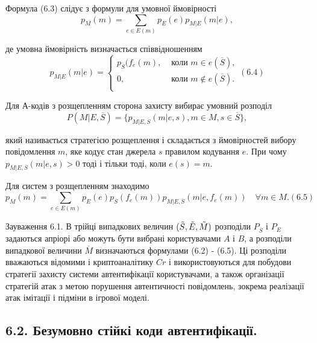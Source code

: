 Формула (6.3) слідує з формули для умовної ймовірності
\begin{equation*}
    p_M(m) = \sum\limits_{e \in E(m)} p_E(e) p_{M|E}(m|e),
\end{equation*}

де умовна ймовірність визначається співвідношенням
\begin{equation}
    p_{M|E}(m|e) = \left\{ \begin{array}{ll}
        p_{\overline{S}}(f_e(m), & \text{ коли } m \in e(\overline{S}), \\
        0, & \text{ коли } m \not\in e(\overline{S}). \\
    \end{array} \right. (6.4)
\end{equation}

Для А-кодів з розщепленням сторона захисту вибирає умовний розподіл
\begin{equation*}
    P(M|E, \overline{S}) = \{p_{M|E, \overline{S}}(m|e, s), m \in M, s \in \overline{S}\},
\end{equation*}

який називається стратегією розщеплення і складається з ймовірностей вибору
повідомлення $m$, яке кодує стан джерела $s$ правилом кодування $e$. При чому
$p_{M|E, \overline{S}}(m|e, s) > 0$ тоді і тільки тоді, коли $e(s) = m$.

Для систем з розщепленням знаходимо
\begin{equation}
    p_M(m) = \sum_{e \in E(m)} p_{E}(e) p_{\overline{S}}(f_e(m)) p_{M|E, \overline{S}}(m|e, f_e(m)) \quad \forall m \in M. (6.5)
\end{equation}

\begin{remark}
    Зауваження 6.1. В трійці випадкових величин $(\Tilde{S}, \Tilde{E}, \Tilde{M})$ розподіли $P_{\overline{S}}$ і $P_{E}$
    задаються апріорі або можуть бути вибрані користувачами $A$ і $B$, а розподіли
    випадкової величини $\overline{M}$ визначаються формулами (6.2) - (6.5). Ці розподіли
    вважаються відомими і криптоаналітику $Cr$ і використовуються для побудови
    стратегії захисту системи автентифікації користувачами, а також організації
    стратегій атак з метою порушення автентичності повідомлень, зокрема реалізації
    атак імітації і підміни в ігрової моделі.
\end{remark}

\subsection{6.2. Безумовно стійкі коди автентифікації.}

